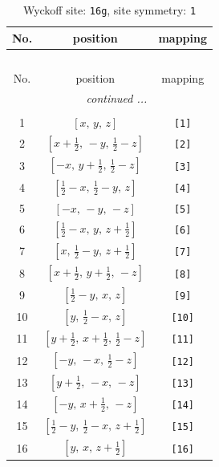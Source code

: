 \documentclass[fleqn,8pt]{jsarticle}
\begin{document}
\begin{longtable}{ccc}
\caption{Wyckoff site: {\tt 16g}, site symmetry: {\tt 1}}
 \\
 \hline \hline
No. & position & mapping \\ \hline \endfirsthead

\multicolumn{2}{l}{\tablename\ \thetable{}} \\
 \hline \hline
No. & position & mapping \\ \hline \endhead

 \hline \hline
\multicolumn{2}{r}{\footnotesize\it continued ...} \\ \endfoot

 \hline \hline
\multicolumn{2}{r}{} \\ \endlastfoot

1 & $\left[ x,\, y,\, z \right]$ & {\tt [1]} \\ \hline
2 & $\left[ x + \frac{1}{2},\, - y,\, \frac{1}{2} - z \right]$ & {\tt [2]} \\ \hline
3 & $\left[ - x,\, y + \frac{1}{2},\, \frac{1}{2} - z \right]$ & {\tt [3]} \\ \hline
4 & $\left[ \frac{1}{2} - x,\, \frac{1}{2} - y,\, z \right]$ & {\tt [4]} \\ \hline
5 & $\left[ - x,\, - y,\, - z \right]$ & {\tt [5]} \\ \hline
6 & $\left[ \frac{1}{2} - x,\, y,\, z + \frac{1}{2} \right]$ & {\tt [6]} \\ \hline
7 & $\left[ x,\, \frac{1}{2} - y,\, z + \frac{1}{2} \right]$ & {\tt [7]} \\ \hline
8 & $\left[ x + \frac{1}{2},\, y + \frac{1}{2},\, - z \right]$ & {\tt [8]} \\ \hline
9 & $\left[ \frac{1}{2} - y,\, x,\, z \right]$ & {\tt [9]} \\ \hline
10 & $\left[ y,\, \frac{1}{2} - x,\, z \right]$ & {\tt [10]} \\ \hline
11 & $\left[ y + \frac{1}{2},\, x + \frac{1}{2},\, \frac{1}{2} - z \right]$ & {\tt [11]} \\ \hline
12 & $\left[ - y,\, - x,\, \frac{1}{2} - z \right]$ & {\tt [12]} \\ \hline
13 & $\left[ y + \frac{1}{2},\, - x,\, - z \right]$ & {\tt [13]} \\ \hline
14 & $\left[ - y,\, x + \frac{1}{2},\, - z \right]$ & {\tt [14]} \\ \hline
15 & $\left[ \frac{1}{2} - y,\, \frac{1}{2} - x,\, z + \frac{1}{2} \right]$ & {\tt [15]} \\ \hline
16 & $\left[ y,\, x,\, z + \frac{1}{2} \right]$ & {\tt [16]} \\
\end{longtable}
\end{document}
